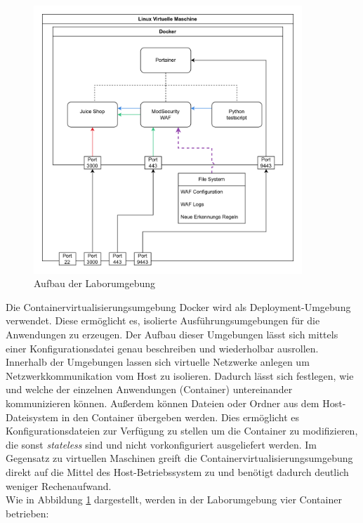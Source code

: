 \begin{figure}[!hbt]
    \centering
    \includegraphics[width=0.9\textwidth]{./images/lab-setup.png}
    \caption{Aufbau der Laborumgebung}
    \label{fig:lab}
\end{figure}

Die Containervirtualisierungsumgebung Docker wird als Deployment-Umgebung verwendet.
Diese ermöglicht es, isolierte Ausführungsumgebungen für die Anwendungen zu erzeugen.
Der Aufbau dieser Umgebungen lässt sich mittels einer Konfigurationsdatei genau beschreiben und wiederholbar ausrollen.
Innerhalb der Umgebungen lassen sich virtuelle Netzwerke anlegen um Netzwerkkommunikation vom Host zu isolieren.
Dadurch lässt sich festlegen, wie und welche der einzelnen Anwendungen (Container) untereinander kommunizieren können.
Außerdem können Dateien oder Ordner aus dem Host-Dateisystem in den Container übergeben werden.
Dies ermöglicht es Konfigurationsdateien zur Verfügung zu stellen um die Container zu modifizieren, die sonst \textit{stateless} sind und nicht vorkonfiguriert ausgeliefert werden.
Im Gegensatz zu virtuellen Maschinen greift die Containervirtualisierungsumgebung direkt auf die Mittel des Host-Betriebssystem zu und benötigt dadurch deutlich weniger Rechenaufwand.\\

Wie in Abbildung \ref{fig:lab} dargestellt, werden in der Laborumgebung vier Container betrieben:

